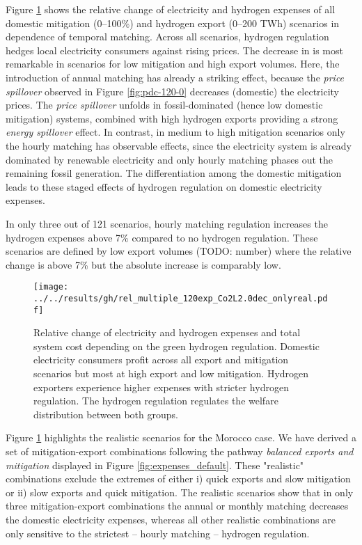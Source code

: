 Figure \ref{fig:expenses_real_120} shows the relative change of electricity and hydrogen expenses of all domestic mitigation (0--100\%) and hydrogen export (0--200 TWh) scenarios in dependence of temporal matching. 
Across all scenarios, hydrogen regulation hedges local electricity consumers against rising prices. The decrease in is most remarkable in scenarios for low mitigation and high export volumes. Here, the introduction of annual matching has already a striking effect, because the \textit{price spillover} observed in Figure \ref{fig:pdc-120-0} decreases (domestic) the electricity prices. The \textit{price spillover} unfolds in fossil-dominated (hence low domestic mitigation) systems, combined with high hydrogen exports providing a strong \textit{energy spillover} effect.
In contrast, in medium to high mitigation scenarios only the hourly matching has observable effects, since the electricity system is already  dominated by renewable electricity and only hourly matching phases out the remaining fossil generation. The differentiation among the domestic mitigation leads to these staged effects of hydrogen regulation on domestic electricity expenses.

In only three out of 121 scenarios, hourly matching regulation increases the hydrogen expenses above 7\% compared to no hydrogen regulation. These scenarios are defined by low export volumes (TODO: number) where the relative change is above 7\% but the absolute increase is comparably low.


\begin{figure}[h!]
    \centering
    \texttt{[image: ../../results/gh/rel\_multiple\_120exp\_Co2L2.0dec\_onlyreal.pdf]}
    \caption{Relative change of electricity and hydrogen expenses and total system cost depending on the green hydrogen regulation. Domestic electricity consumers profit across all export and mitigation scenarios but most at high export and low mitigation. Hydrogen exporters experience higher expenses with stricter hydrogen regulation. The hydrogen regulation regulates the welfare distribution between both groups.}
    \label{fig:expenses_real_120}
\end{figure}


Figure \ref{fig:expenses_real_120} highlights the realistic scenarios for the Morocco case. We have derived a set of mitigation-export combinations following the pathway \textit{balanced exports and mitigation} displayed in Figure \ref{fig:expenses_default}. These "realistic" combinations exclude the extremes of either i) quick exports and slow mitigation or ii)
slow exports and quick mitigation. The realistic scenarios show that in only three mitigation-export combinations the annual or monthly matching decreases the domestic electricity expenses, whereas all other realistic combinations are only sensitive to the strictest -- hourly matching -- hydrogen regulation. 


